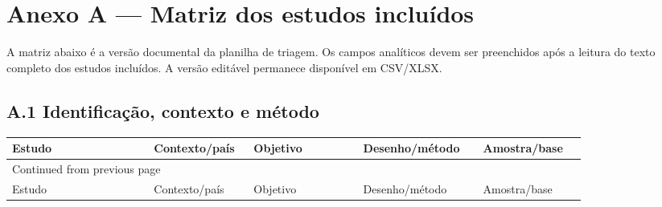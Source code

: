 \documentclass[12pt,a4paper]{article}
\begin{document}
\section{Anexo A — Matriz dos estudos incluídos}
\label{sec:org36985ee}
A matriz abaixo é a versão documental da planilha de triagem. Os campos analíticos devem ser preenchidos após a leitura do texto completo dos estudos incluídos. A versão editável permanece disponível em CSV/XLSX.

\subsection{A.1 Identificação, contexto e método}
\label{sec:orgd07bb52}
\begin{landscape}
\footnotesize
\begin{longtable}{p{0.22\linewidth}p{0.11\linewidth}p{0.17\linewidth}p{0.17\linewidth}p{0.16\linewidth}}
Estudo & Contexto/país & Objetivo & Desenho/método & Amostra/base\\
\hline
\endfirsthead
\multicolumn{5}{l}{Continued from previous page} \\
\hline

Estudo & Contexto/país & Objetivo & Desenho/método & Amostra/base \\


\end{longtable}
\end{landscape}
\end{document}
